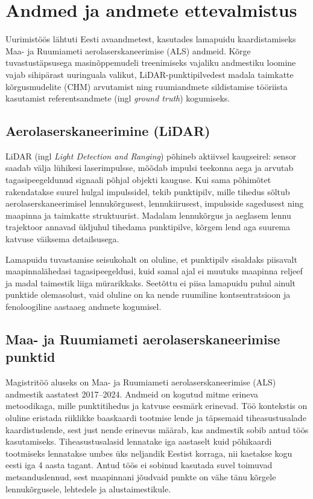 \section{Andmed ja andmete ettevalmistus}
\label{andmed}

Uurimistöös lähtuti Eesti avaandmetest, kasutades lamapuidu kaardistamiseks Maa- ja Ruumiameti aerolaserskaneerimise (ALS) andmeid. Kõrge tuvastustäpsusega masinõppemudeli treenimiseks vajaliku andmestiku loomine vajab sihipärast uuringuala valikut, LiDAR-punktipilvedest madala taimkatte kõrgusmudelite (CHM) arvutamist ning ruumiandmete sildistamise tööriista kasutamist referentsandmete (ingl \textit{ground truth}) kogumiseks.

\subsection{Aerolaserskaneerimine (LiDAR)}

LiDAR (ingl \textit {Light Detection and Ranging}) põhineb aktiivsel kaugseirel: sensor saadab välja lühikesi laserimpulsse, mõõdab impulsi teekonna aega ja arvutab tagasipeegeldunud signaali põhjal objekti kauguse. Kui sama põhimõtet rakendatakse suurel hulgal impulssidel, tekib punktipilv, mille tihedus sõltub aerolaserskaneerimisel lennukõrgusest, lennukiirusest, impulsside sagedusest ning maapinna ja taimkatte struktuurist. Madalam lennukõrgus ja aeglasem lennu trajektoor annavad üldjuhul tihedama punktipilve, kõrgem lend aga suurema katvuse väiksema detailsusega.

Lamapuidu tuvastamise seisukohalt on oluline, et punktipilv sisaldaks piisavalt maapinnalähedasi tagasipeegeldusi, kuid samal ajal ei muutuks maapinna reljeef ja madal taimestik liiga mürarikkaks. Seetõttu ei piisa lamapuidu puhul ainult punktide olemasolust, vaid oluline on ka nende ruumiline kontsentratsioon ja fenoloogiline aastaaeg andmete kogumisel.



\subsection{Maa- ja Ruumiameti aerolaserskaneerimise punktid}

Magistritöö aluseks on Maa- ja Ruumiameti aerolaserskaneerimise (ALS) andmestik aastatest 2017--2024. Andmeid on kogutud mitme erineva metoodikaga, mille punktitihedus ja katvuse eesmärk erinevad. Töö kontekstis on oluline eristada riiklikke baaskaardi tootmise lende ja täpsemaid tiheasustusalade kaardistuslende, sest just nende erinevus määrab, kas andmestik sobib antud töös kasutamiseks. Tiheasustusalasid lennatake iga aastaselt kuid põhikaardi tootmiseks lennatakse umbes üks neljandik Eestist korraga, nii kaetakse kogu eesti iga 4 aasta tagant. Antud töös ei sobinud kasutada suvel toimuvad metsanduslennud, sest maapinnani jõudvaid punkte on vähe tänu kõrgele lennukõrgusele, lehtedele ja alustaimestikule.

